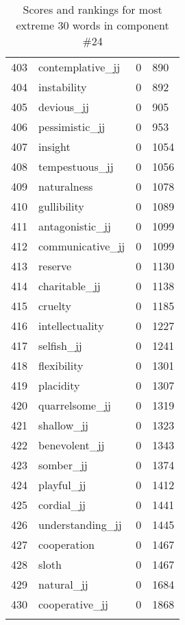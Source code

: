 \begin{longtable}[!htbp]{| rlr@{.}l |}
    403 & contemplative\_jj & 0 & 890 \\
    404 & instability & 0 & 892 \\
    405 & devious\_jj & 0 & 905 \\
    406 & pessimistic\_jj & 0 & 953 \\
    407 & insight & 0 & 1054 \\
    408 & tempestuous\_jj & 0 & 1056 \\
    409 & naturalness & 0 & 1078 \\
    410 & gullibility & 0 & 1089 \\
    411 & antagonistic\_jj & 0 & 1099 \\
    412 & communicative\_jj & 0 & 1099 \\
    413 & reserve & 0 & 1130 \\
    414 & charitable\_jj & 0 & 1138 \\
    415 & cruelty & 0 & 1185 \\
    416 & intellectuality & 0 & 1227 \\
    417 & selfish\_jj & 0 & 1241 \\
    418 & flexibility & 0 & 1301 \\
    419 & placidity & 0 & 1307 \\
    420 & quarrelsome\_jj & 0 & 1319 \\
    421 & shallow\_jj & 0 & 1323 \\
    422 & benevolent\_jj & 0 & 1343 \\
    423 & somber\_jj & 0 & 1374 \\
    424 & playful\_jj & 0 & 1412 \\
    425 & cordial\_jj & 0 & 1441 \\
    426 & understanding\_jj & 0 & 1445 \\
    427 & cooperation & 0 & 1467 \\
    428 & sloth & 0 & 1467 \\
    429 & natural\_jj & 0 & 1684 \\
    430 & cooperative\_jj & 0 & 1868 \\
    \hline
    \caption{Scores and rankings for most extreme 30 words in component \#24} \\
\end{longtable}

